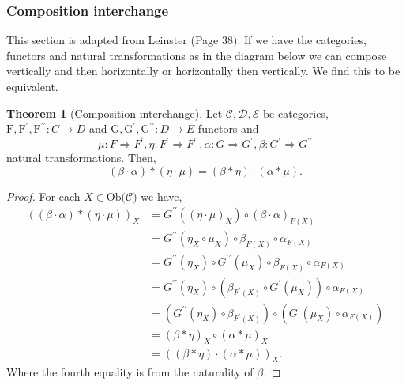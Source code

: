 \documentclass[11pt,a4paper]{article}
\theoremstyle{definition}
\newtheorem{thm}{Theorem}[section]
\newcommand\ob[1]{\mathrm{Ob(}#1\mathrm{)}}
\newcommand\cat[1]{\mathscr{#1}}
\newcommand\func[3]{\mathrm{#1}\colon#2\rightarrow#3}
\newcommand\nattran[3]{#1\colon#2\Rightarrow#3}
\numberwithin{equation}{section}
\begin{document}
\subsubsection{Composition interchange}
\label{sss:compinterchange} 
This section is adapted from Leinster \cite{Leinster} (Page 38). If we have the categories, functors and natural transformations as in the diagram below we can compose vertically and then horizontally or horizontally then vertically. We find this to be equivalent.
\begin{center}
\end{center}
\begin{thm}[Composition interchange]
\label{thm:interchange}
Let $\cat{C,D,E}$ be categories, $\func{F,F^\prime,F^{\prime\prime}}{C}{D}$ and $\func{G,G^\prime,G^{\prime\prime}}{D}{E}$ functors and \[\nattran{\mu}{F}{F^\prime}, \nattran{\eta}{F^\prime}{F^{\prime\prime}}, \nattran{\alpha}{G}{G^\prime}, \nattran{\beta}{G^\prime}{G^{\prime\prime}}\] natural transformations. Then,
\begin{equation}
\label{eqn:interchange}
(\beta\cdot\alpha)*(\eta\cdot\mu)=(\beta*\eta)\cdot(\alpha*\mu).
\end{equation}
\end{thm}
\begin{proof}
For each $X\in\ob{\cat{C}}$ we have,
\begin{align*}
    ((\beta\cdot\alpha)*(\eta\cdot\mu))_{X} &= G^{\prime\prime}((\eta\cdot\mu)_{X})\circ(\beta\cdot\alpha)_{F(X)}\\
    &= G^{\prime\prime}(\eta_{X}\circ\mu_{X})\circ\beta_{F(X)}\circ\alpha_{F(X)}\\
    &= G^{\prime\prime}(\eta_{X})\circ G^{\prime\prime}(\mu_{X})\circ\beta_{F(X)}\circ\alpha_{F(X)}\\
    &= G^{\prime\prime}(\eta_{X})\circ (\beta_{F^{\prime}(X)}\circ G^\prime(\mu_{X}))\circ\alpha_{F(X)}\\
    &= (G^{\prime\prime}(\eta_{X})\circ \beta_{F^{\prime}(X)})\circ (G^{\prime}(\mu_{X})\circ\alpha_{F(X)})\\
    &=(\beta*\eta)_{X}\circ(\alpha*\mu)_{X}\\
    &= ((\beta*\eta)\cdot(\alpha*\mu))_{X}.
\end{align*}
Where the fourth equality is from the naturality of $\beta$.
\end{proof}
\end{document}
